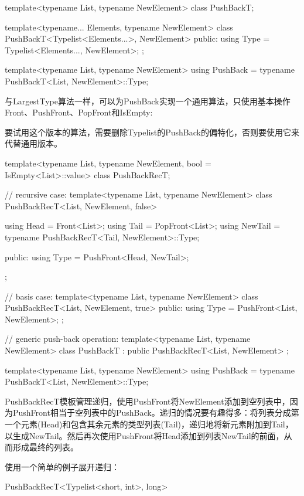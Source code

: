 \begin{cpp}
template<typename List, typename NewElement>
class PushBackT;

template<typename... Elements, typename NewElement>
class PushBackT<Typelist<Elements...>, NewElement> {
	public:
	using Type = Typelist<Elements..., NewElement>;
};

template<typename List, typename NewElement>
using PushBack = typename PushBackT<List, NewElement>::Type;
\end{cpp}

与LargestType算法一样，可以为PushBack实现一个通用算法，只使用基本操作Front、PushFront、PopFront和IsEmpty:

\begin{notice}
要试用这个版本的算法，需要删除Typelist的PushBack的偏特化，否则要使用它来代替通用版本。
\end{notice}

\begin{cpp}
template<typename List, typename NewElement, bool = IsEmpty<List>::value>
class PushBackRecT;

// recursive case:
template<typename List, typename NewElement>
class PushBackRecT<List, NewElement, false> {
	using Head = Front<List>;
	using Tail = PopFront<List>;
	using NewTail = typename PushBackRecT<Tail, NewElement>::Type;
	
	public:
	using Type = PushFront<Head, NewTail>;
};

// basis case:
template<typename List, typename NewElement>
class PushBackRecT<List, NewElement, true> {
	public:
	using Type = PushFront<List, NewElement>;
};

// generic push-back operation:
template<typename List, typename NewElement>
class PushBackT : public PushBackRecT<List, NewElement> { };

template<typename List, typename NewElement>
using PushBack = typename PushBackT<List, NewElement>::Type;
\end{cpp}

PushBackRecT模板管理递归，使用PushFront将NewElement添加到空列表中，因为PushFront相当于空列表中的PushBack。递归的情况要有趣得多：将列表分成第一个元素(Head)和包含其余元素的类型列表(Tail)，递归地将新元素附加到Tail，以生成NewTail。然后再次使用PushFront将Head添加到列表NewTail的前面，从而形成最终的列表。

使用一个简单的例子展开递归：

\begin{cpp}
PushBackRecT<Typelist<short, int>, long>
\end{cpp}

